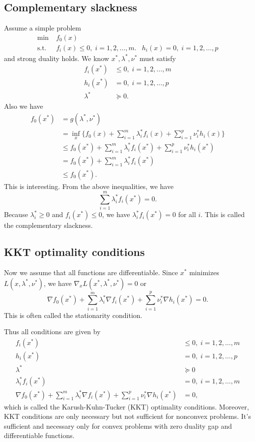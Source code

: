 \documentclass[lang=en,color=blue,mode=fancy,titlestyle=hang]{elegantbook}
\begin{document}
\subsection{Complementary slackness}
Assume a simple problem
\begin{align*}
\min \; &f_0(x)\\
\text{s.t.} \; &f_i(x) \leq 0, \; i = 1, 2, \ldots, m.
&h_i(x) = 0, \; i = 1, 2, \ldots, p
\end{align*}
and strong duality holds. We know $x^*, \lambda^*, \nu^*$ must satisfy
\begin{align*}
f_i(x^*) &\leq 0, \; i = 1, 2, \ldots, m\\
h_i(x^*) &= 0, \; i = 1, 2, \ldots, p\\
\lambda^* &\succeq 0.
\end{align*}
Also we have
\begin{align*}
f_0(x^*) &= g(\lambda^*, \nu^*)\\
&= \inf_x \{f_0(x) + \sum_{i=1}^m \lambda_i^* f_i(x) + \sum_{i=1}^p \nu_i^* h_i(x)\}\\
&\leq f_0(x^*) + \sum_{i=1}^m \lambda_i^* f_i(x^*) + \sum_{i=1}^p \nu_i^* h_i(x^*)\\
&= f_0(x^*) + \sum_{i=1}^m \lambda_i^* f_i(x^*)\\
&\leq f_0(x^*).
\end{align*}
This is interesting. From the above inequalities, we have
\[
\sum_{i=1}^m \lambda_i^* f_i(x^*) = 0.
\]
Because $\lambda_i^* \geq 0$ and $f_i(x^*) \leq 0$, we have $\lambda_i^* f_i(x^*) = 0$
for all $i$. This is called the complementary slackness.

\subsection{KKT optimality conditions}
Now we assume that all functions are differentiable. Since $x^*$ minimizes
$L(x, \lambda^*, \nu^*)$, we have $\nabla_x L(x^*, \lambda^*, \nu^*) = 0$ or
\[
\nabla f_0(x^*) + \sum_{i=1}^m \lambda_i^* \nabla f_i(x^*) + \sum_{i=1}^p \nu_i^* \nabla h_i(x^*) = 0.
\]
This is often called the stationarity condition.

Thus all conditions are given by
\begin{align*}
f_i(x^*) &\leq 0, \; i = 1, 2, \ldots, m\\
h_i(x^*) &= 0, \; i = 1, 2, \ldots, p\\
\lambda^* &\succeq 0\\
\lambda_i^* f_i(x^*) &= 0, \; i = 1, 2, \ldots, m\\
\nabla f_0(x^*) + \sum_{i=1}^m \lambda_i^* \nabla f_i(x^*) + \sum_{i=1}^p \nu_i^* \nabla h_i(x^*) &= 0,
\end{align*}
which is called the Karush-Kuhn-Tucker (KKT) optimality conditions. Moreover, KKT conditions
are only necessary but not sufficient for nonconvex problems. It's sufficient and necessary
only for convex problems with zero duality gap and differentiable functions.
\end{document}
